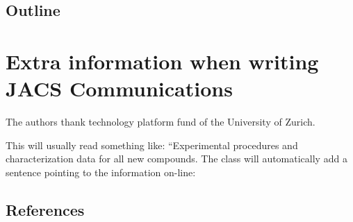 \documentclass[journal=jacsat,manuscript=article]{achemso}
\begin{document}
\hypertarget{outline}{%
\subsection{Outline}\label{outline}}

\hypertarget{extra-information-when-writing-jacs-communications}{%
\section{Extra information when writing JACS
Communications}\label{extra-information-when-writing-jacs-communications}}

\begin{acknowledgement}

The authors thank technology platform fund of the University of Zurich.


\end{acknowledgement}

\begin{suppinfo}

This will usually read something like: ``Experimental procedures and
characterization data for all new compounds. The class will
automatically add a sentence pointing to the information on-line:

\end{suppinfo}

\hypertarget{references}{%
\subsection{References}\label{references}}
\end{document}
